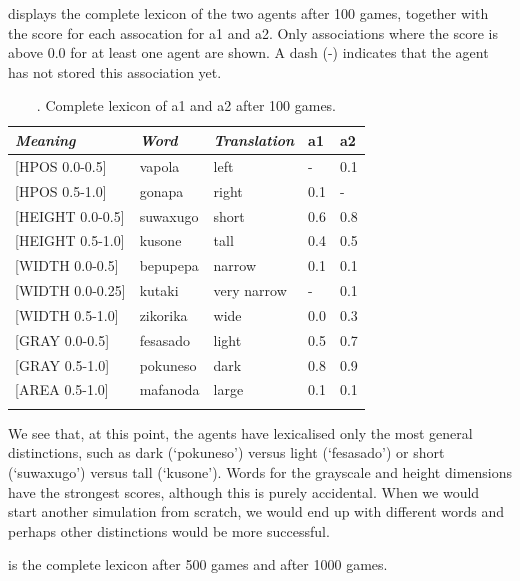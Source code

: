  displays the complete lexicon of the two agents after 100 games, 
together with the score for each assocation for 
{\bfshape  a1} and {\bfshape  a2}. Only associations where the 
score is above 0.0 for at least one agent are shown. 
A dash (-) indicates that the agent has not stored 
this association yet. 


\begin{table}
\begin{center}
\begin{tabular}{ l  l  l  l  l }
\lsptoprule
{\itshape Meaning}&{\itshape Word}&{\itshape Translation} & {\bfshape  a1}&{\bfshape  a2} \\ \midrule
{}[HPOS 0.0-0.5] & vapola&left&-&0.1\\ 
{}[HPOS 0.5-1.0]& gonapa&right &0.1&-\\ 
{}[HEIGHT 0.0-0.5]&suwaxugo&short &0.6&0.8\\ 
{}[HEIGHT 0.5-1.0]& kusone&tall &0.4&0.5\\ 
{}[WIDTH 0.0-0.5]&bepupepa&narrow &0.1&0.1\\ 
{}[WIDTH 0.0-0.25]&kutaki&very narrow &-&0.1\\ 
{}[WIDTH 0.5-1.0]& zikorika&wide &0.0&0.3\\ 
{}[GRAY 0.0-0.5]& fesasado&light &0.5&0.7\\ 
{}[GRAY 0.5-1.0]& pokuneso&dark &0.8&0.9\\ 
{}[AREA 0.5-1.0]& mafanoda&large &0.1&0.1\\ 
\lspbottomrule
\end{tabular}
\caption{\label{tab:lex100}. Complete lexicon of {\bfshape  a1} and {\bfshape  a2} after 100 games.}
\end{center}
\end{table}
We see that, at this point, the agents have lexicalised 
only the most general distinctions, such as dark (`pokuneso') 
versus light (`fesasado') or short (`suwaxugo') versus tall 
(`kusone'). Words for the grayscale and height dimensions
have the strongest scores, although this is purely accidental. 
When we would start another simulation from scratch,
we would end up with different words and perhaps 
other distinctions would be more successful. 

 is the complete lexicon after 500 games and  after 1000 games. 


